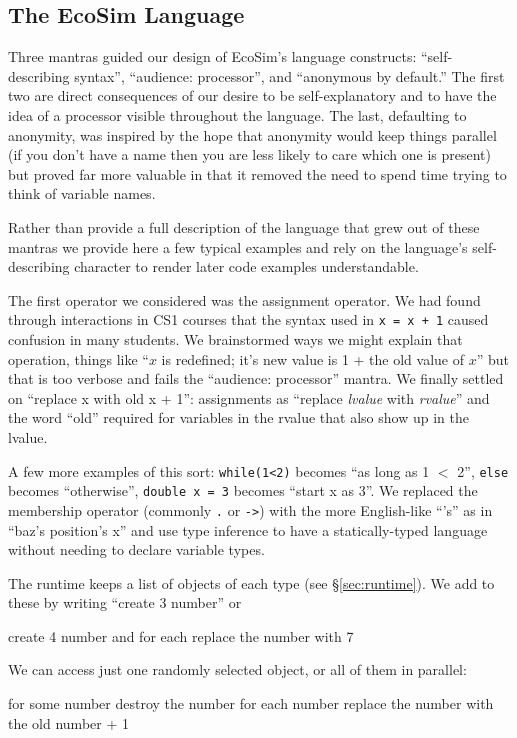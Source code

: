\documentclass{sig-alternate}
\newcommand{\INDSTATE}[1][1]{\STATE\hspace{#1\algorithmicindent}}
\newcommand{\EcoSim}{EcoSim}
\newenvironment{snippet}{\begin{algorithmic}[1]}{\end{algorithmic}}
\begin{document}
\subsection{The \EcoSim{} Language}
Three mantras guided our design of \EcoSim{}'s language constructs:
``self-describing syntax'', ``audience: processor'', and ``anonymous by default.''
The first two are direct consequences of our desire to be self-explanatory 
and to have the idea of a processor visible throughout the language.
The last, defaulting to anonymity,
was inspired by the hope that anonymity would keep things parallel 
(if you don't have a name then you are less likely to care which one is present)
but proved far more valuable in that it removed the need 
to spend time trying to think of variable names.

Rather than provide a full description of the language that grew out of these mantras
we provide here a few typical examples
and rely on the language's self-describing character 
to render later code examples understandable.

The first operator we considered was the assignment operator.
We had found through interactions in CS1 courses
that the syntax used in \texttt{x = x + 1} caused confusion in many students.
We brainstormed ways we might explain that operation,
things like ``$x$ is redefined; it's new value is 1 + the old value of $x$''
but that is too verbose and fails the ``audience: processor'' mantra.
We finally settled on ``replace x with old x + 1'':
assignments as ``replace \emph{lvalue} with \emph{rvalue}''
and the word ``old'' required for variables in the rvalue that also show up in the lvalue.

A few more examples of this sort:
\texttt{while(1<2)} becomes ``as long as 1 $<$ 2'',
\texttt{else} becomes ``otherwise'',
\texttt{double x = 3} becomes ``start x as 3''.
We replaced the membership operator (commonly \texttt{.} or \texttt{->})
with the more English-like ``'s'' as in ``baz's position's x''
and use type inference to have a statically-typed language 
without needing to declare variable types.

The runtime keeps a list of objects of each type (see \S\ref{sec:runtime}).
We add to these by writing ``create 3 number'' or 
\begin{snippet}
\STATE create 4 number and for each 
\INDSTATE replace the number with 7
\end{snippet}
We can access just one randomly selected object, or all of them in parallel:
\begin{snippet}
\STATE for some number
\INDSTATE destroy the number
\STATE for each number
\INDSTATE replace the number with the old number + 1
\end{snippet}
\end{document}
